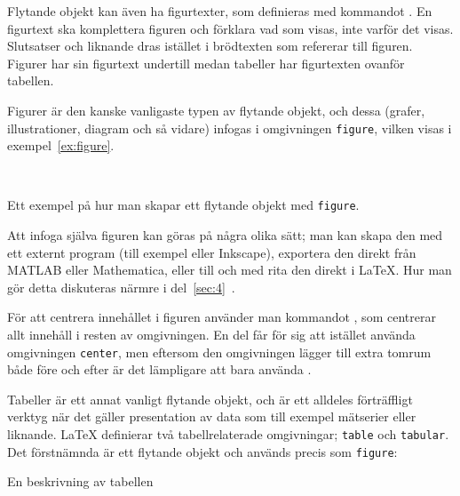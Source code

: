 \documentclass[../../latex.tex]{subfiles}
\begin{document}
Flytande objekt kan även ha figurtexter, som definieras med kommandot
. En figurtext ska komplettera figuren och förklara vad som
visas, inte varför det visas. Slutsatser och liknande dras istället i
brödtexten som refererar till figuren. Figurer har sin figurtext undertill
medan tabeller har figurtexten ovanför tabellen.

Figurer är den kanske vanligaste typen av flytande objekt, och dessa
(grafer, illustrationer, diagram och så vidare) infogas i omgivningen
\texttt{figure}, vilken visas i exempel~\vref{ex:figure}.

\begin{kod}
	\centering\hspace{0.0075\textwidth}
	\begin{minipage}{0.75\textwidth} %
			\vfil{}\vfil
	\end{minipage}
	\\ \medskip
	\begin{minipage}{0.725\textwidth} %
	\end{minipage}
	\caption{Ett exempel på hur man skapar ett flytande objekt med
	\texttt{figure}.}
	\label{ex:figure}
\end{kod}

Att infoga själva figuren kan göras på några olika sätt; man kan skapa den
med ett externt program (till exempel  eller Inkscape), 
exportera den direkt från MATLAB eller Mathematica, eller till och med
rita den direkt i \LaTeX. Hur man gör detta diskuteras närmre i
del~\ref{sec:4}~.

För att centrera innehållet i figuren använder man kommandot 
, som centrerar allt innehåll i resten av omgivningen. En
del får för sig att istället använda omgivningen \texttt{center}, men
eftersom den omgivningen lägger till extra tomrum både före och efter är
det lämpligare att bara använda .

\label{pack:booktabs}
Tabeller är ett annat vanligt flytande objekt, och är ett alldeles
förträffligt verktyg när det gäller presentation av data som till exempel
mätserier eller liknande. \LaTeX{} definierar två tabellrelaterade
omgivningar; \texttt{table} och \texttt{tabular}. Det förstnämnda är ett
flytande objekt och används precis som \texttt{figure}:
\begin{latexcode}
\begin{table}[tpb]
\centering 
\caption{En beskrivning av tabellen}
\end{table}
\end{latexcode}
\end{document}

